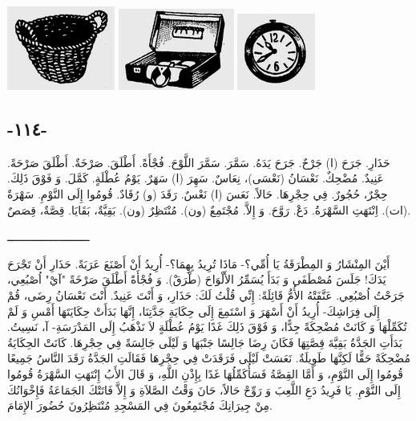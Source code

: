 \documentclass[a5paper]{article}
\begin{document}
 \includegraphics[width=1.3957in,height=1.0835in]{MuhammadBagauddinlatinized-img308.png}   \includegraphics[width=1.5in,height=1.052in]{MuhammadBagauddinlatinized-img309.png}   \includegraphics[width=1.0102in,height=0.9898in]{MuhammadBagauddinlatinized-img310.png} 

\subsection{-١١٤-}
حَذَارِ. جَرَحَ (ا) جَرْحٌ. جَرَحَ يَدَهُ. سَمَّرَ. سَمَّرَ اللَّوْحَ. فُجْأَةً. أَطْلَقَ. صَرْخَةٌ. أَطْلَقَ صَرْحَةً. عَنِيدٌ. مُضْحِكٌ. نَعْسَانُ (نَعْسَى)، نِعَاسٌ. سَهِرَ (ا) سَهَرٌ. يَوْمُ عُطْلَةٍ. كَمَّلَ. وَ فَوْقَ ذَلِكَ. حِجْرٌ، حُجُورٌ. فِي حِجْرِهَا. حَالاً. نَعَسَ (ا) نَعْسٌ. رَقَدَ (و) رُقَادٌ. قُومُوا إِلَى النَّوْمِ. سَهْرَةٌ (ات). اِنْتَهَتِ السَّهْرَةُ. دَعْ. رَوَّحَ. وَ إِلاَّ. مُجْتَمِعٌ (ون). مُنْتَظِرٌ (ون). بَقِيَّةٌ، بَقَايَا. قِصَّةٌ، قِصَصٌ.

ـــــــــــــــــــــــــ

أَيْنَ المِنْشَارُ وَ المِطْرَقَةُ يَا أُمِّي؟- مَاذَا تُرِيدُ بِهِمَا؟- أُرِيدُ أَنْ أَصْنَعَ عَرَبَةً. حَذَارِ أَنْ تَجْرَحَ يَدَكَ! جَلَسَ مُصْطَفَى وَ بَدَأَ يُسَمِّرُ الأَلْوَاحَ (طْرَقْ). وَ فُجْأَةً أَطْلَقَ صَرْخَةً "آيْ" اُصْبُعِي، جَرَحْتُ اُصْبُعِي. عَنَّفَتْهُ الأُمُّ قَائِلَةً: إِنِّي قُلْتُ لَكَ: حَذَارِ، وَ أَنْتَ عَنِيدٌ. أَنْتَ نَعْسَانُ رِضَى، قُمْ إِلَى فِرَاشِكَ- أُرِيدُ أَنْ أَسْهَرَ وَ اسْتَمِعَ إِلَى حِكَايَةِ جَدَّتِنَا، إِنَّهَا بَدَأَتْ حِكَايَتَهَا أَمْسِ وَ لَمْ تُكَمِّلْهَا وَ كَانَتْ مُضْحِكَةً جِدًّا، وَ فَوْقَ ذَلِكَ غَدًا يَوْمُ عُطْلَةٍ لاَ نَذْهَبُ إِلَى المَدْرَسَةِ- آ، نَسِيتُ. بَدَأَتِ الجَدَّةُ بَقِيَّةَ قِصَّتِهَا فَكَانَ رِضَا جَالِسًا جَنْبَهَا وَ لَيْلَى جَالِسَةً فِي حِجْرِهَا. كَانَتْ الحِكَايَةُ مُضْحِكَةً حَقًّا لَكِنَّهَا طَوِيلَةٌ. نَعَسَتْ لَيْلَى فَرَقَدَتْ فِي حِجْرِهَا فَقَالَتِ الجَدَّةُ رَقَدَ النَّاسُ جَمِيعًا قُومُوا إِلَى النَّوْمِ، وَ أَمَّا القِصَّةُ فَسَأُكَمِّلُهَا غَدًا بِإِذْنِ اللَّهِ، وَ قَالَ الأَبُ إِنْتَهَتِ السَّهْرَةُ قُومُوا إِلَى النَّوْمِ. يَا فَرِيدُ دَعِ اللَّعِبَ وَ رَوِّحْ حَالاً، حَانَ وَقْتُ الصَّلاَةِ وَ إِلاَّ فَاتَتْكَ الجَمَاعَةُ فَإِخْوَانُكَ مِنْ جِيرَانِكَ مُجْتَمِعُونَ فِي المَسْجِدِ مُنْتَظِرُونَ حُضُورَ الإِمَامَ. 
\end{document}
